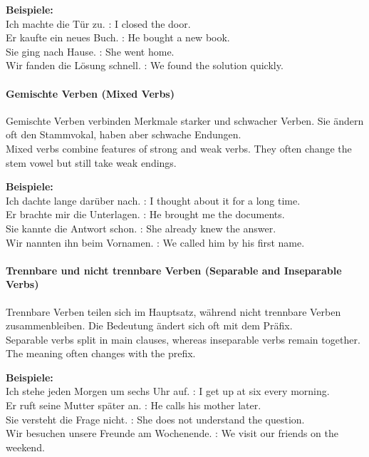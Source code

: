 \documentclass[a4paper]{article}
\begin{document}
                \textbf{Beispiele:}\\
                Ich machte die Tür zu. : I closed the door.\\
                Er kaufte ein neues Buch. : He bought a new book.\\
                Sie ging nach Hause. : She went home.\\
                Wir fanden die Lösung schnell. : We found the solution quickly.
            
            \paragraph{Gemischte Verben {\small (Mixed Verbs)}}
                Gemischte Verben verbinden Merkmale starker und schwacher Verben. Sie ändern oft den Stammvokal, haben aber schwache Endungen.\\
                Mixed verbs combine features of strong and weak verbs. They often change the stem vowel but still take weak endings.
                
                \textbf{Beispiele:}\\
                Ich dachte lange darüber nach. : I thought about it for a long time.\\
                Er brachte mir die Unterlagen. : He brought me the documents.\\
                Sie kannte die Antwort schon. : She already knew the answer.\\
                Wir nannten ihn beim Vornamen. : We called him by his first name.
            
            \paragraph{Trennbare und nicht trennbare Verben {\small (Separable and Inseparable Verbs)}}
                Trennbare Verben teilen sich im Hauptsatz, während nicht trennbare Verben zusammenbleiben. Die Bedeutung ändert sich oft mit dem Präfix.\\
                Separable verbs split in main clauses, whereas inseparable verbs remain together. The meaning often changes with the prefix.
                
                \textbf{Beispiele:}\\
                Ich stehe jeden Morgen um sechs Uhr auf. : I get up at six every morning.\\
                Er ruft seine Mutter später an. : He calls his mother later.\\
                Sie versteht die Frage nicht. : She does not understand the question.\\
                Wir besuchen unsere Freunde am Wochenende. : We visit our friends on the weekend.
            
\end{document}
